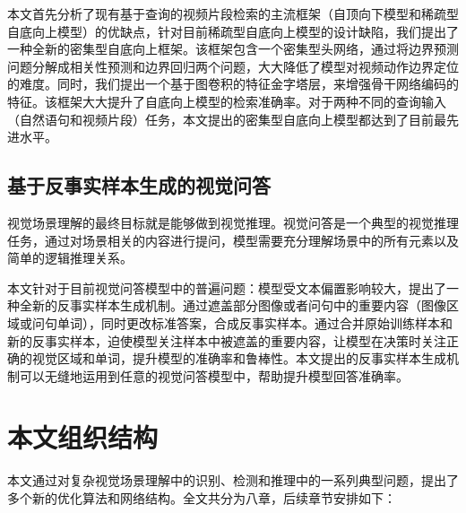 本文首先分析了现有基于查询的视频片段检索的主流框架（自顶向下模型和稀疏型自底向上模型）的优缺点，针对目前稀疏型自底向上模型的设计缺陷，我们提出了一种全新的密集型自底向上框架。该框架包含一个密集型头网络，通过将边界预测问题分解成相关性预测和边界回归两个问题，大大降低了模型对视频动作边界定位的难度。同时，我们提出一个基于图卷积的特征金字塔层，来增强骨干网络编码的特征。该框架大大提升了自底向上模型的检索准确率。对于两种不同的查询输入（自然语句和视频片段）任务，本文提出的密集型自底向上模型都达到了目前最先进水平。

\subsection{基于反事实样本生成的视觉问答}

视觉场景理解的最终目标就是能够做到视觉推理。视觉问答是一个典型的视觉推理任务，通过对场景相关的内容进行提问，模型需要充分理解场景中的所有元素以及简单的逻辑推理关系。

本文针对于目前视觉问答模型中的普遍问题：模型受文本偏置影响较大，提出了一种全新的反事实样本生成机制。通过遮盖部分图像或者问句中的重要内容（图像区域或问句单词），同时更改标准答案，合成反事实样本。通过合并原始训练样本和新的反事实样本，迫使模型关注样本中被遮盖的重要内容，让模型在决策时关注正确的视觉区域和单词，提升模型的准确率和鲁棒性。本文提出的反事实样本生成机制可以无缝地运用到任意的视觉问答模型中，帮助提升模型回答准确率。

\section{本文组织结构}
本文通过对复杂视觉场景理解中的识别、检测和推理中的一系列典型问题，提出了多个新的优化算法和网络结构。全文共分为八章，后续章节安排如下：

